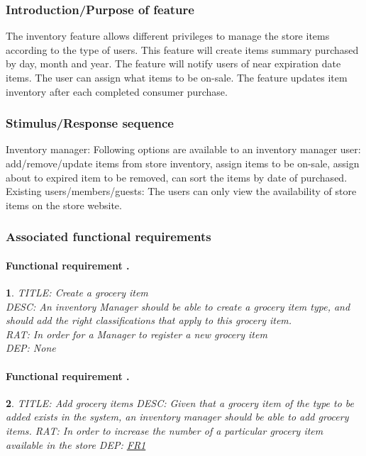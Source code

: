 \documentclass{scrreprt}
\theoremstyle{funreq}
\newtheorem{funreq}{}
\newcommand*{\reqref}[1]{\hyperref[#1]{FR\ref*{#1}}}
\begin{document}
	\subsubsection{Introduction/Purpose of feature}
	The inventory feature allows different privileges to manage the store items according to the type of users. This feature will create items summary purchased by day, month and year. The feature will notify users of near expiration date items. The user can assign what items to be on-sale. The feature updates item inventory after each completed consumer purchase.
	
	\subsubsection{Stimulus/Response sequence}
	Inventory manager:
	Following options are available to an inventory manager user: add/remove/update items from store inventory, assign items to be on-sale, assign about to expired item to be removed, can sort the items by date of purchased.
	Existing users/members/guests:
	The users can only view the availability of store items on the store website.
	
	\subsubsection{Associated functional requirements}
	\paragraph[]{Functional requirement .}
	\begin{funreq}
		
		\label{inventory_create}
		TITLE: Create a grocery item\\
		DESC: An inventory Manager should be able to create a grocery item type, and should add the right classifications that apply to this grocery item. \\
		RAT: In order for a Manager to register a new grocery item\\
		DEP: None\\
	\end{funreq}
	
	\paragraph[]{Functional requirement .}
	\begin{funreq}
		
		\label{inventory_additems}
		TITLE: Add grocery items
		DESC: Given that a grocery item of the type to be added exists in the system, an inventory manager should be able to add grocery items.
		RAT: In order to increase the number of a particular grocery item available in the store
		DEP: \reqref{inventory_create}
	\end{funreq}
	
\end{document}
